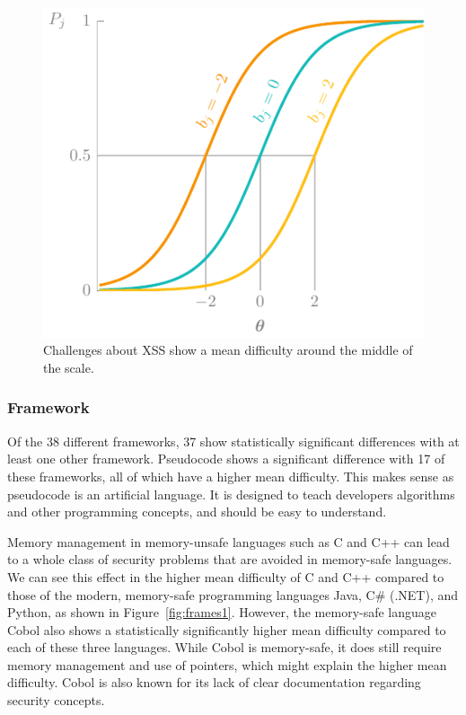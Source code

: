 \begin{figure}
    \centering
    \includegraphics[page=21]{03-education/figures/tikzfigures.pdf}
    \caption[Medium mean difficulty for XSS challenges]{Challenges about XSS show a mean difficulty around the middle of the scale.}
    \label{fig:cats2}
\end{figure}

\subsubsection{Framework}
Of the 38 different frameworks, 37 show statistically significant differences with at least one other framework.
Pseudocode shows a significant difference with 17 of these frameworks, all of which have a higher mean difficulty.
This makes sense as pseudocode is an artificial language.
It is designed to teach developers algorithms and other programming concepts, and should be easy to understand.

Memory management in memory-unsafe languages such as C and C++ can lead to a whole class of security problems that are avoided in memory-safe languages.
We can see this effect in the higher mean difficulty of C and C++ compared to those of the modern, memory-safe programming languages Java, C\# (.NET), and Python, as shown in Figure~\ref{fig:frames1}.
However, the memory-safe language Cobol also shows a statistically significantly higher mean difficulty compared to each of these three languages.
While Cobol is memory-safe, it does still require memory management and use of pointers, which might explain the higher mean difficulty.
Cobol is also known for its lack of clear documentation regarding security concepts.

